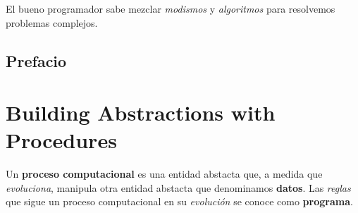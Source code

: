 El bueno programador sabe mezclar \textit{modismos} y \textit{algoritmos} para resolvemos problemas complejos.

\subsection{Prefacio}

\section{Building Abstractions with Procedures}

Un \textbf{proceso computacional} es una entidad abstacta que,
a medida que \textit{evoluciona},
manipula otra entidad abstacta que denominamos \textbf{datos}.
Las \textit{reglas} que sigue un proceso computacional 
en su \textit{evolución} se conoce como 
\textbf{programa}.